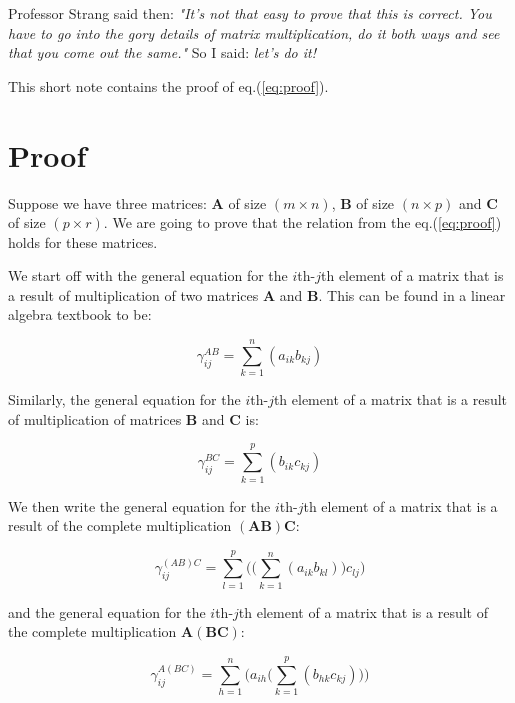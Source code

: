 \documentclass[10pt,twocolumn]{article}
\begin{document}
Professor Strang said then: \textit{"It's not that easy to prove that this is correct. You have to go into the gory details of matrix multiplication, do it both ways and see that you come out the same."} So I said: \textit{let's do it!}

This short note contains the proof of eq.(\ref{eq:proof}).

\section*{Proof}

Suppose we have three matrices: $\bm{A}$ of size $(m \times n)$, $\bm{B}$ of size $(n \times p)$ and $\bm{C}$ of size $(p \times r)$. We are going to prove that the relation from the eq.(\ref{eq:proof}) holds for these matrices.

We start off with the general equation for the $i$th-$j$th element of a matrix that is a result of multiplication of two matrices $\bm{A}$ and $\bm{B}$. This can be found in a linear algebra textbook to be:

\begin{equation}
\gamma_{ij}^{AB} = \sum_{k=1}^{n} (a_{ik} b_{kj})
\end{equation}

Similarly, the general equation for the $i$th-$j$th element of a matrix that is a result of multiplication of matrices $\bm{B}$ and $\bm{C}$ is:

\begin{equation}
\gamma_{ij}^{BC} = \sum_{k=1}^{p} (b_{ik} c_{kj})
\end{equation}

We then write the general equation for the $i$th-$j$th element of a matrix that is a result of the complete multiplication $(\bm{A} \bm{B}) \bm{C}$:

\begin{equation} \label{eq:ab_c}
\gamma_{ij}^{(AB)C} = \sum_{l=1}^{p} \Big( \big( \sum_{k=1}^{n} (a_{ik} b_{kl}) \big) c_{lj} \Big)
\end{equation}

and the general equation for the $i$th-$j$th element of a matrix that is a result of the complete multiplication $\bm{A} (\bm{B} \bm{C})$:

\begin{equation} \label{eq:a_bc}
\gamma_{ij}^{A(BC)} = \sum_{h=1}^{n} \Big(  a_{ih} \big( \sum_{k=1}^{p} (b_{hk} c_{kj}) \big) \Big)
\end{equation}
\end{document}

